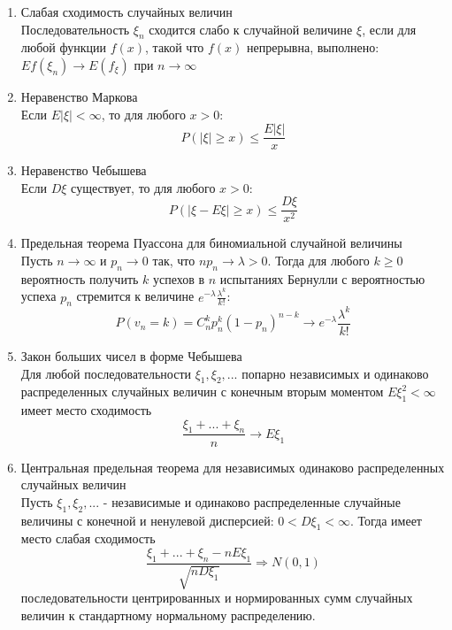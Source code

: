 \documentclass[a4paper, 12pt]{article}
\begin{document}
\begin{enumerate}
    \item Слабая сходимость случайных величин\\
    Последовательность ${\xi_n}$ сходится слабо к случайной величине $\xi$, если для любой функции $f(x)$, такой что $f(x)$ непрерывна, выполнено: $Ef(\xi_n)\rightarrow E(f_\xi)$ при $n\rightarrow\infty$
    
    \item Неравенство Маркова\\
    Если $E|\xi|<\infty$, то для любого $x>0$:
    \[ P(|\xi|\geq x)\leq \frac{E|\xi|}{x}\]
    
    \item Неравенство Чебышева\\
    Если $D\xi$ существует, то для любого $x>0$:
    \[ P(|\xi-E\xi|\geq x) \leq \frac{D\xi}{x^2}\]
    
    \item Предельная теорема Пуассона для биномиальной случайной величины\\ 
    Пусть $n\rightarrow\infty$ и $p_n\rightarrow 0$ так, что $np_n\rightarrow\lambda>0$. Тогда для любого $k\geq 0$ вероятность получить $k$ успехов в $n$ испытаниях Бернулли с вероятностью успеха $p_n$ стремится к величине $e^{-\lambda}\frac{\lambda^k}{k!}$:
    \[P(v_n=k)=C_n^kp_n^k(1-p_n)^{n-k}\rightarrow e^{-\lambda}\frac{\lambda^k}{k!}\]
    
    \item Закон больших чисел в форме Чебышева\\
    Для любой последовательности $\xi_1,\xi_2,...$ попарно независимых и одинаково распределенных случайных величин с конечным вторым моментом $E\xi_1^2<\infty$ имеет место сходимость
    \[\frac{\xi_1+...+\xi_n}{n}\rightarrow E\xi_1\]
    
    \item Центральная предельная теорема для независимых одинаково распределенных случайных величин\\
    Пусть $\xi_1,\xi_2,...$ - независимые и одинаково распределенные случайные величины с конечной и ненулевой дисперсией: $0<D\xi_1<\infty$. Тогда имеет место слабая сходимость
    \[ \frac{\xi_1+...+\xi_n-nE\xi_1}{\sqrt{nD\xi_1}}\Rightarrow N(0,1)\]
    последовательности центрированных и нормированных сумм случайных величин к стандартному нормальному распределению. 
\end{enumerate}
\end{document}
